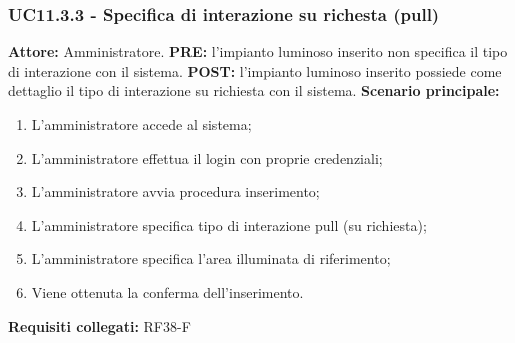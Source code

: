 \documentclass[a4paper, 12pt]{article}
\begin{document}
\subsubsection{UC11.3.3 - Specifica di interazione su richesta (pull)}
\textbf{Attore:} Amministratore.\newline
\textbf{PRE:} l'impianto luminoso inserito non specifica il tipo di interazione con il sistema.\newline
\textbf{POST:} l'impianto luminoso inserito possiede come dettaglio il tipo di interazione su richiesta con il sistema.\newline
\textbf{Scenario principale:}
\begin{enumerate}
    \item L'amministratore accede al sistema;
    \item L'amministratore effettua il login con proprie credenziali;
    \item L'amministratore avvia procedura inserimento;
    \item L'amministratore specifica tipo di interazione pull (su richiesta);
    \item L'amministratore specifica l'area illuminata di riferimento;
    \item Viene ottenuta la conferma dell'inserimento.
\end{enumerate}
\textbf{Requisiti collegati:} RF38-F\newline
\end{document}
